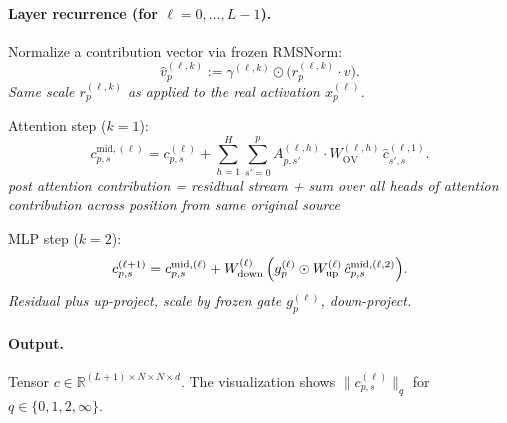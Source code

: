 \documentclass[11pt]{article}
\begin{document}
\paragraph{Layer recurrence (for $\ell = 0,\dots,L-1$).}

Normalize a contribution vector via frozen RMSNorm:
\begin{equation}
    \hat{v}^{(\ell,k)}_p := \gamma^{(\ell,k)} \odot \bigl(r^{(\ell,k)}_p \cdot v\bigr).
\end{equation}
\textit{Same scale $r^{(\ell,k)}_p$ as applied to the real activation $x^{(\ell)}_p$.}

Attention step ($k=1$):
\begin{equation}
    c^{\mathrm{mid},(\ell)}_{p,s}
    = c^{(\ell)}_{p,s}
      + \sum_{h=1}^{H}\sum_{s'=0}^{p}
        A^{(\ell,h)}_{p,s'}\cdot
        W^{(\ell,h)}_{\mathrm{OV}}\,\hat{c}^{(\ell,1)}_{s',s}.
\end{equation}
\textit{post attention contribution = residtual stream + sum over all heads of attention contribution across position from same original source }

MLP step ($k=2$):
\begin{equation}
    c^{(\ell+1)}_{p,s}
    = c^{\mathrm{mid},(\ell)}_{p,s}
      + W^{(\ell)}_{\mathrm{down}}\,
        \Bigl(g^{(\ell)}_p \odot W^{(\ell)}_{\mathrm{up}}\,\hat{c}^{\mathrm{mid},(\ell,2)}_{p,s}\Bigr).
\end{equation}
\textit{Residual plus up-project, scale by frozen gate $g^{(\ell)}_p$, down-project.}

\paragraph{Output.} Tensor $c \in \mathbb{R}^{(L+1)\times N\times N\times d}$.
The visualization shows $\|c^{(\ell)}_{p,s}\|_q$ for $q \in \{0,1,2,\infty\}$.
\end{document}
